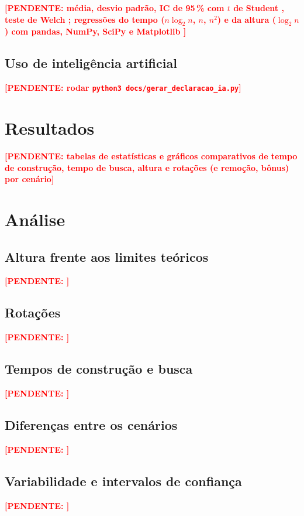 \documentclass[
    12pt,
    oneside,
    a4paper,
    openany,
    chapter=TITLE,
    english,
    brazil
]{abntex2}
\newcommand{\pendente}[1]{\textcolor{red}{\textbf{[PENDENTE: #1]}}}
\begin{document}
\pendente{média, desvio padrão, IC de 95\,\% com $t$ de Student \cite{montgomery2016}, teste de Welch \cite{welch1947}; regressões do tempo ($n \log_2 n$, $n$, $n^2$) e da altura ($\log_2 n$) com pandas, NumPy, SciPy e Matplotlib \cite{mckinney2010,harris2020,virtanen2020,hunter2007}}

\section{Uso de inteligência artificial}
\label{sec:uso-ia}

    {}
    {\pendente{rodar \texttt{python3 docs/gerar\_declaracao\_ia.py}}}

\chapter{Resultados}
\label{cap:resultados}

\pendente{tabelas de estatísticas e gráficos comparativos de tempo de construção, tempo de busca, altura e rotações (e remoção, bônus) por cenário}

\chapter{Análise}
\label{cap:analise}

\section{Altura frente aos limites teóricos}
\pendente{}

\section{Rotações}
\pendente{}

\section{Tempos de construção e busca}
\pendente{}

\section{Diferenças entre os cenários}
\pendente{}

\section{Variabilidade e intervalos de confiança}
\pendente{}
\end{document}
